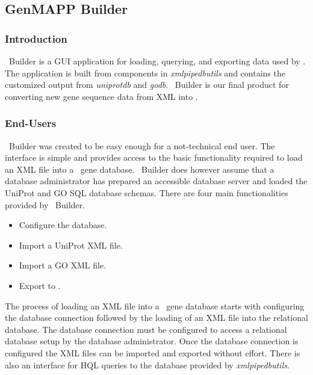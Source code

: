 \subsection{GenMAPP Builder}
\label{gmbuilder}

\subsubsection{Introduction}
\genmapp~Builder is a GUI application for loading, querying, and exporting data
used by \genmapp. The application is built from components in \emph{xmlpipedbutils} and contains the customized output from \emph{uniprotdb} and \emph{godb}. \genmapp~Builder is our final product for converting new gene sequence data from XML into \genmapp.

\subsubsection{End-Users}
\genmapp~Builder was created to be easy enough for a not-technical end user.  The interface is simple and provides access to the basic functionality required to load an XML file into a \genmapp~gene database.  \genmapp~Builder does however assume that a database administrator has prepared an accessible database server and loaded the UniProt and GO SQL database schemas.  There are four main functionalities provided by \genmapp~Builder.
\begin{itemize}
	\item {Configure the database.}
	\item {Import a UniProt XML file. }
	\item {Import a GO XML file.}
	\item {Export to \genmapp.}
\end{itemize}
The process of loading an XML file into a \genmapp~gene database starts with configuring the database connection followed by the loading of an XML file into the relational database.  The database connection must be configured to access a relational database setup by the database administrator.  Once the database connection is configured the XML files can be imported and exported without effort.  There is also an interface for HQL queries to the database provided by \emph{xmlpipedbutils}.

